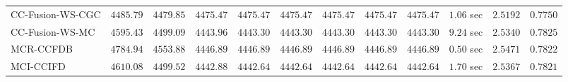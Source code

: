 \begin{table}[H]
\begin{tabular}{lrrrrrrrrrrr}
    CC-Fusion-WS-CGC & $      4485.79$ & $      4479.85$ & $      4475.47$ & $      4475.47$ & $      4475.47$ & $      4475.47$ & $      4475.47$ & $      4475.47$ & $         1.06$ sec    & $       2.5192$  & $       0.7750$ \\ 
     CC-Fusion-WS-MC & $      4595.43$ & $      4499.09$ & $      4443.96$ & $      4443.30$ & $      4443.30$ & $      4443.30$ & $      4443.30$ & $      4443.30$ & $         9.24$ sec    & $       2.5340$  & $       0.7825$ \\ 
\cmidrule{1-1} 
           MCR-CCFDB & $      4784.94$ & $      4553.88$ & $      4446.89$ & $      4446.89$ & $      4446.89$ & $      4446.89$ & $      4446.89$ & $      4446.89$ & $         0.50$ sec    & $       2.5471$  & $       0.7822$ \\ 
\cmidrule{1-1} 
           MCI-CCIFD & $      4610.08$ & $      4499.52$ & $      4442.88$ & $      4442.64$ & $      4442.64$ & $      4442.64$ & $      4442.64$ & $      4442.64$ & $         1.70$ sec    & $       2.5367$  & $       0.7821$ \\ 
\bottomrule
\end{tabular}
\end{table}